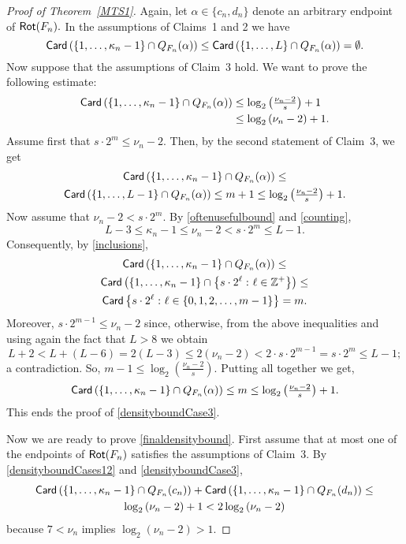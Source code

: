 \documentclass[a4paper, 11pt]{amsart}
\numberwithin{equation}{section}
\theoremstyle{customnumberedtheorem}
\theoremstyle{definitionwithbfnote}
\newcommand{\Z}{\ensuremath{\mathbb{Z}}}
\DeclareMathOperator{\Rot}{\textsf{\upshape Rot}}
\DeclareMathOperator{\Card}{\textsf{\upshape Card}}
\newcommand{\set}[2]{\ensuremath{\left\{#1 \,\colon #2\right\}}}
\begin{document}
\begin{proof}[Proof of Theorem~\ref{MTS1}]
Again, let $\alpha \in \{c_n, d_n\}$ denote
an arbitrary endpoint of $\Rot(F_n).$
In the assumptions of Claims~1 and 2 we have
\begin{equation}\label{densityboundCases12}
  \Card\left(\{1,\dots, \kappa_n-1\} \cap Q_{F_n}(\alpha)\right)
    \le \Card\left(\{1,\dots, L\} \cap Q_{F_n}(\alpha)\right) =\emptyset.
\end{equation}
Now suppose that the assumptions of Claim~3 hold.
We want to prove the following estimate:
\begin{equation}\label{densityboundCase3}
\begin{split}
  \Card\left(\{1,\dots, \kappa_n-1\} \cap Q_{F_n}(\alpha)\right)
    & \le \log_2\left(\tfrac{\nu_n - 2}{s}\right) + 1 \\
    & \le \log_2\left(\nu_n - 2\right) + 1.
\end{split}
\end{equation}
Assume first that $s \cdot 2^m \le \nu_n - 2.$
Then, by the second statement of Claim~3, we get
\begin{multline*}
  \Card\left(\{1,\dots, \kappa_n-1\} \cap Q_{F_n}(\alpha)\right) \le\\
  \Card\left(\{1,\dots, L-1\} \cap Q_{F_n}(\alpha)\right) \le m+1
     \le \log_2\left(\tfrac{\nu_n - 2}{s}\right) + 1.
\end{multline*}
Now assume that $\nu_n - 2 < s \cdot 2^m.$
By \eqref{oftenusefulbound} and \eqref{counting},
\[ L - 3 \le \kappa_n-1 \le \nu_n - 2 < s \cdot 2^m \le L-1. \]
Consequently, by \eqref{inclusions},
\begin{multline*}
  \Card\left(\{1,\dots, \kappa_n-1\} \cap Q_{F_n}(\alpha)\right) \le \\
  \Card\left(\{1,\dots, \kappa_n-1\} \cap \set{s \cdot 2^\ell}{\ell\in\Z^+}\right) \le \\
   \Card\set{s \cdot 2^\ell}{\ell\in\{0,1,2,\dots,m-1\}} = m.
\end{multline*}
Moreover, $s \cdot 2^{m-1} \le \nu_n - 2$ since, otherwise,
from the above inequalities and using again the fact that $L > 8$
we obtain
\[
 L + 2 < L + (L - 6) = 2(L-3) \le 2\left(\nu_n - 2\right) < 2\cdot s \cdot 2^{m-1} = s \cdot 2^m \le L-1;
\]
a contradiction.
So, $m-1 \le \log_2\left(\tfrac{\nu_n - 2}{s}\right).$
Putting all together we get,
\[
  \Card\left(\{1,\dots, \kappa_n-1\} \cap Q_{F_n}(\alpha)\right) \le m \le \log_2\left(\tfrac{\nu_n - 2}{s}\right) + 1.
\]
This ends the proof of \eqref{densityboundCase3}.

Now we are ready to prove \eqref{finaldensitybound}.
First assume that at most one of the endpoints of $\Rot(F_n)$
satisfies the assumptions of Claim~3.
By \eqref{densityboundCases12} and \eqref{densityboundCase3},
\begin{multline*}
  \Card\left(\{1,\dots, \kappa_n-1\} \cap Q_{F_n}(c_n) \right) + \Card\left(\{1,\dots, \kappa_n-1\} \cap Q_{F_n}(d_n)\right) \le \\
  \log_2\left(\nu_n - 2\right) + 1 < 2\log_2\left(\nu_n - 2\right)
\end{multline*}
because $7 < \nu_n$ implies $\log_2(\nu_n-2) > 1.$


\end{proof}
\end{document}
